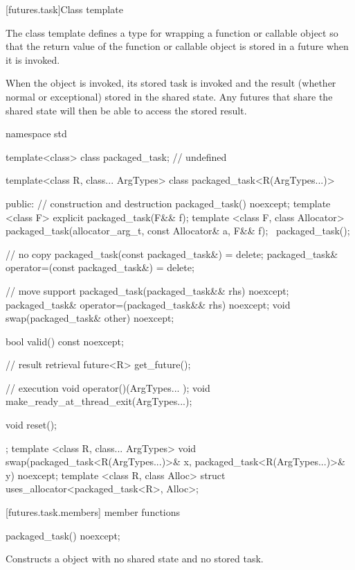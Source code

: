 [futures.task]{Class template }

\pnum
The class template  defines a type for wrapping a function or
callable object so that the return value of the function or callable object is stored in
a future when it is invoked.

\pnum
When the  object is invoked, its stored task is invoked and the
result (whether normal or exceptional) stored in the shared state. Any futures that
share the shared state will then be able to access the stored result.

\begin{codeblock}
namespace std {
  template<class> class packaged_task; // undefined

  template<class R, class... ArgTypes>
  class packaged_task<R(ArgTypes...)> {
  public:
    // construction and destruction
    packaged_task() noexcept;
    template <class F>
      explicit packaged_task(F&& f);
    template <class F, class Allocator>
      packaged_task(allocator_arg_t, const Allocator& a, F&& f);
    ~packaged_task();

    // no copy
    packaged_task(const packaged_task&) = delete;
    packaged_task& operator=(const packaged_task&) = delete;

    // move support
    packaged_task(packaged_task&& rhs) noexcept;
    packaged_task& operator=(packaged_task&& rhs) noexcept;
    void swap(packaged_task& other) noexcept;

    bool valid() const noexcept;

    // result retrieval
    future<R> get_future();        

    // execution
    void operator()(ArgTypes... );
    void make_ready_at_thread_exit(ArgTypes...);

    void reset();
  };
  template <class R, class... ArgTypes>
    void swap(packaged_task<R(ArgTypes...)>& x, packaged_task<R(ArgTypes...)>& y) noexcept;
  template <class R, class Alloc>
    struct uses_allocator<packaged_task<R>, Alloc>;
}
\end{codeblock}

[futures.task.members]{ member functions}

%
\begin{itemdecl}
packaged_task() noexcept;
\end{itemdecl}

\begin{itemdescr}
\pnum
\effects Constructs a  object with no shared state and no stored task.
\end{itemdescr}

